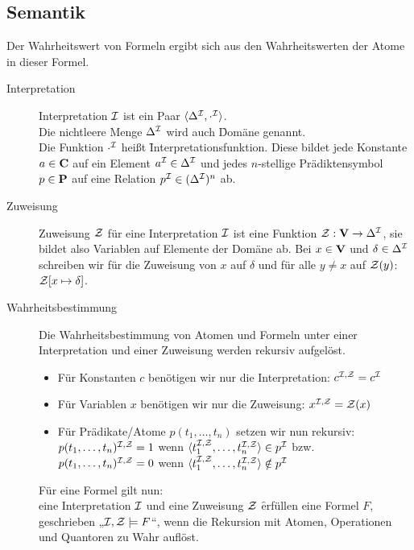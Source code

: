 \subsection{Semantik}
    Der Wahrheitswert von Formeln ergibt sich aus den Wahrheitswerten der Atome in dieser Formel. 
    \begin{description}
        \item[Interpretation] Interpretation $\mathcal{I}$  ist ein Paar $\langle\Delta^{\mathcal{I}}, \cdot^{\mathcal{I}}\rangle$.\\
            Die nichtleere Menge $\Delta^{\mathcal{I}}$ wird auch \f{Domäne} genannt. \\
            Die Funktion $\cdot^{\mathcal{I}}$ heißt \f{Interpretationsfunktion}. Diese bildet jede Konstante $a \in \textbf{C}$ auf ein Element $a^{\mathcal{I}} \in \Delta^{\mathcal{I}}$ und jedes $n$-stellige Prädiktensymbol $p \in \textbf{P}$ auf eine Relation $p^{\mathcal{I}} \in (\Delta^{\mathcal{I}})^{n}$ ab.

        \item[Zuweisung] Zuweisung $\mathcal{Z}$ für eine Interpretation $\mathcal{I}$ ist eine Funktion $\mathcal{Z}: \textbf{V} \to \Delta^{\mathcal{I}}$, sie bildet also Variablen auf Elemente der Domäne ab.
            Bei $x \in \textbf{V}$ und $\delta \in \Delta^{\mathcal{I}}$ schreiben wir für die Zuweisung von $x$ auf $\delta$ und für alle $y \neq x$ auf $\mathcal{Z} (y)$: $\mathcal{Z}[x \mapsto \delta]$.{}

        \item[Wahrheitsbestimmung] Die Wahrheitsbestimmung von Atomen und Formeln unter einer Interpretation und einer Zuweisung werden rekursiv aufgelöst.
            \begin{itemize}
                \item Für Konstanten $c$ benötigen wir nur die Interpretation: $c^{\mathcal{I},\mathcal{Z}} = c^{\mathcal{I}}$
                \item Für Variablen $x$ benötigen wir nur die Zuweisung: $x^{\mathcal{I},\mathcal{Z}} = \mathcal{Z}(x)${}
                \item Für Prädikate/Atome $p(t_{1},\dots,t_{n})$ setzen wir nun rekursiv: \\
                    $p(t_{1},\dots,t_{n})^{\mathcal{I},\mathcal{Z}} = 1$ wenn $\langle t_{1}^{\mathcal{I},\mathcal{Z}},\dots,t_{n}^{\mathcal{I},\mathcal{Z}} \rangle \in p^{\mathcal{I}}$ bzw. \\
                    $p(t_{1},\dots,t_{n})^{\mathcal{I},\mathcal{Z}} = 0$ wenn $\langle t_{1}^{\mathcal{I},\mathcal{Z}},\dots,t_{n}^{\mathcal{I},\mathcal{Z}} \rangle \notin p^{\mathcal{I}}$
            \end{itemize}

            Für eine Formel gilt nun: \\
            eine Interpretation $\mathcal{I}$ und eine Zuweisung $\mathcal{Z}$ \f{erfüllen} eine Formel $F$, geschrieben „$\mathcal{I}, \mathcal{Z} \models F$“, wenn die Rekursion mit Atomen, Operationen und Quantoren zu Wahr auflöst.
    \end{description}

